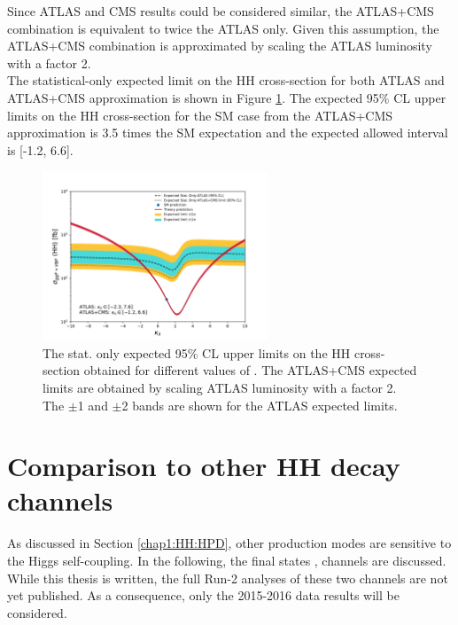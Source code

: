 Since ATLAS and CMS results could be considered similar, the ATLAS+CMS \HHyybb combination is equivalent to twice the ATLAS only. Given this assumption, the ATLAS+CMS combination is approximated by scaling the ATLAS \HHyybb luminosity with a factor 2. \\
The statistical-only expected limit on the HH cross-section for both ATLAS and ATLAS+CMS approximation is shown in Figure \ref{fig:HHyybb:CMS+ATLAS}. The expected 95\% CL upper limits on the HH cross-section for the SM case from the ATLAS+CMS approximation is 3.5 times the SM expectation and the expected allowed \kl interval is [-1.2, 6.6]. 

\begin{figure}[htbp]
    \centering
    \includegraphics[width=0.6\textwidth]{Ch5/Img/kappa_lambda_ATLAS_CMS_stat.pdf}
    \begin{tcolorbox}[colback=black!5!white, colframe=white!75!black]
    \caption{The stat. only expected 95\% CL upper limits on the HH cross-section obtained for different values of \kl. The ATLAS+CMS expected limits are obtained by scaling ATLAS luminosity with a factor 2. The $\pm$1 and $\pm$2 bands are shown for the ATLAS expected limits.}
    \label{fig:HHyybb:CMS+ATLAS}
    \end{tcolorbox}
\end{figure}


\section{Comparison to other HH decay channels}
\label{HHyybb:HH}
As discussed in Section \ref{chap1:HH:HPD}, other production modes are sensitive to the Higgs self-coupling. In the following, the final states \bbbb, \bbtt channels are discussed. While this thesis is written, the full Run-2 analyses of these two channels are not yet published. As a consequence, only the 2015-2016 data results will be considered.

